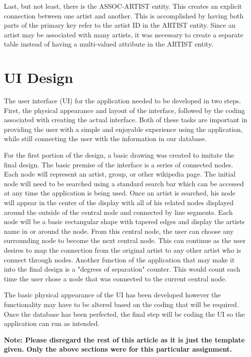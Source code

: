 \documentclass{sig-alternate}
\begin{document}
Last, but not least, there is the ASSOC-ARTIST entity. This creates an explicit connection between one artist 
and another. This is accomplished by having both parts of the primary key refer to the artist ID in the ARTIST 
entity. Since an artist may be associated with many artists, it was necessary to create a separate table instead 
of having a multi-valued attribute in the ARTIST entity.

\section{UI Design}
\label{ui design}

The user interface (UI) for the application needed to be developed in two steps. First, the physical appearance 
and layout of the interface, followed by the coding associated with creating the actual interface. Both of these 
tasks are important in providing the user with a simple and enjoyable experience using the application, while 
still connecting the user with the information in our database. 

For the first portion of the design, a basic drawing was created to imitate the final design. The basic premise 
of the interface is a series of connected nodes. Each node will represent an artist, group, or other wikipedia 
page. The initial node will need to be searched using a standard search bar which can be accessed at any time 
the application is being used. Once an artist is searched, his node will appear in the center of the display 
with all of his related nodes displayed around the outside of the central node and connected by line segments. 
Each node will be a basic rectangular shape with tapered edges and display the artists name in or around the node. 
From this central node, the user can choose any surrounding node to become the next central node. This can continue 
as the user desires to map the connection from the original artist to any other artist who is connect through nodes.
Another function of the application that may make it into the final design is a "degrees of separation" counter. 
This would count each time the user chose a node that was connected to the current central node. 

The basic physical appearance of the UI has been developed however the functionality may have to be altered 
based on the coding that will be required. Once the database has been perfected, the final step will be 
coding the UI so the application can run as intended. 

{\bf Note: Please disregard the rest of this article as it is just
the template given. Only the above sections were 
for this particular assignment.}
\end{document}
